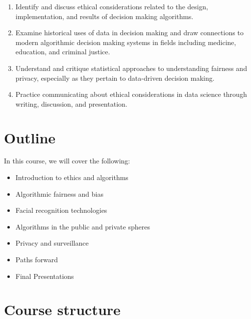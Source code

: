 \documentclass[
]{article}
\providecommand{\tightlist}{%
  \setlength{\itemsep}{0pt}\setlength{\parskip}{0pt}}
\begin{document}
\begin{enumerate}
\def\labelenumi{\arabic{enumi}.}
\item
  Identify and discuss ethical considerations related to the design,
  implementation, and results of decision making algorithms.
\item
  Examine historical uses of data in decision making and draw
  connections to modern algorithmic decision making systems in fields
  including medicine, education, and criminal justice.
\item
  Understand and critique statistical approaches to understanding
  fairness and privacy, especially as they pertain to data-driven
  decision making.
\item
  Practice communicating about ethical considerations in data science
  through writing, discussion, and presentation.
\end{enumerate}

\hypertarget{outline}{%
\section{Outline}\label{outline}}

In this course, we will cover the following:

\begin{itemize}
\tightlist
\item
  Introduction to ethics and algorithms
\item
  Algorithmic fairness and bias
\item
  Facial recognition technologies
\item
  Algorithms in the public and private spheres
\item
  Privacy and surveillance
\item
  Paths forward
\item
  Final Presentations
\end{itemize}

\hypertarget{course-structure}{%
\section{Course structure}\label{course-structure}}
\end{document}
